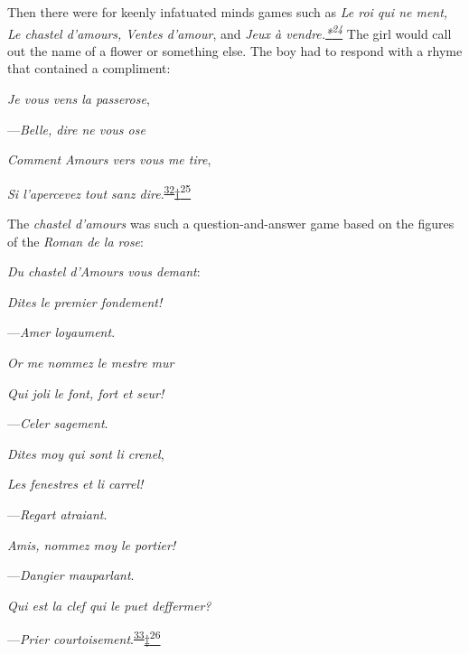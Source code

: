 Then there were for keenly infatuated minds games such as \emph{Le
\protect\hypertarget{11_Chapter_Four__THE_FORMS_OF_LOVE.xhtmlux5cux23page_143}{}{}roi
qui ne ment, Le chastel d'amours, Ventes d'amour}, and \emph{Jeux à
vendre.\protect\hypertarget{11_Chapter_Four__THE_FORMS_OF_LOVE.xhtmlux5cux23id_3147}{\protect\hyperlink{23_NOTES.xhtmlux5cux23id_3148}{*\textsuperscript{24}}}}
The girl would call out the name of a flower or something else. The boy
had to respond with a rhyme that contained a compliment:

\emph{Je vous vens la passerose},

---\emph{Belle, dire ne vous ose}

\emph{Comment Amours vers vous me tire},

\emph{Si l'apercevez tout sanz
dire}.\textsuperscript{\protect\hypertarget{11_Chapter_Four__THE_FORMS_OF_LOVE.xhtmlux5cux23id_1425}{\protect\hyperlink{23_NOTES.xhtmlux5cux23id_1426}{32}}}\protect\hypertarget{11_Chapter_Four__THE_FORMS_OF_LOVE.xhtmlux5cux23id_3149}{\protect\hyperlink{23_NOTES.xhtmlux5cux23id_3150}{†\textsuperscript{25}}}

The \emph{chastel d'amours} was such a question-and-answer game based on
the figures of the \emph{Roman de la rose}:

\emph{Du chastel d'Amours vous demant}:

\emph{Dites le premier fondement!}

---\emph{Amer loyaument}.

\emph{Or me nommez le mestre mur}

\emph{Qui joli le font, fort et seur!}

---\emph{Celer sagement}.

\emph{Dites moy qui sont li crenel},

\emph{Les fenestres et li carrel!}

---\emph{Regart atraiant}.

\emph{Amis, nommez moy le portier!}

---\emph{Dangier mauparlant}.

\emph{Qui est la clef qui le puet deffermer?}

---\emph{Prier
courtoisement}.\textsuperscript{\protect\hypertarget{11_Chapter_Four__THE_FORMS_OF_LOVE.xhtmlux5cux23id_1423}{\protect\hyperlink{23_NOTES.xhtmlux5cux23id_1424}{33}}}\protect\hypertarget{11_Chapter_Four__THE_FORMS_OF_LOVE.xhtmlux5cux23id_3151}{\protect\hyperlink{23_NOTES.xhtmlux5cux23id_3152}{‡\textsuperscript{26}}}

